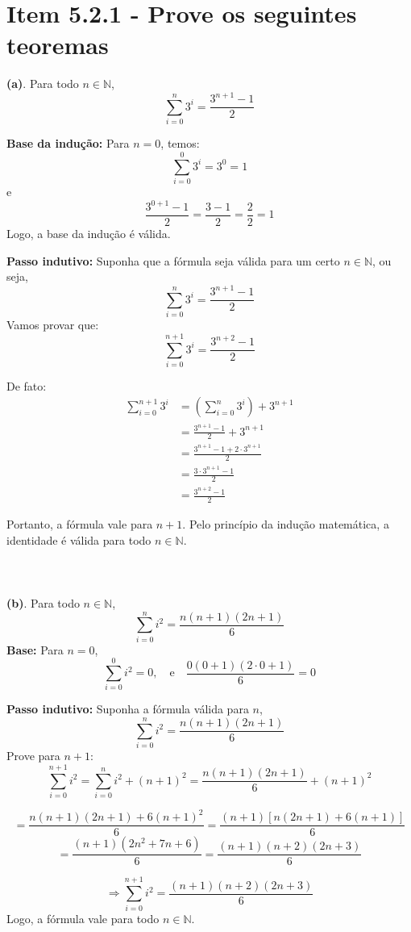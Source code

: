 \documentclass{article}
\begin{document}
\section{Item 5.2.1 - Prove os seguintes teoremas}

\textbf{(a)}. 
Para todo \( n \in \mathbb{N} \),\[\sum_{i=0}^{n} 3^i=\frac{3^{n+1} - 1}{2}\]

\textbf{Base da indução:} Para \( n = 0 \), temos:
\[
\sum_{i=0}^{0} 3^i = 3^0 = 1
\]
e
\[
\frac{3^{0+1} - 1}{2} = \frac{3 - 1}{2} = \frac{2}{2} = 1
\]
Logo, a base da indução é válida.

\textbf{Passo indutivo:} Suponha que a fórmula seja válida para um certo \( n \in \mathbb{N} \), ou seja,
\[
\sum_{i=0}^{n} 3^i = \frac{3^{n+1} - 1}{2}
\]
Vamos provar que:
\[
\sum_{i=0}^{n+1} 3^i = \frac{3^{n+2} - 1}{2}
\]

De fato:
\begin{align*}
\sum_{i=0}^{n+1} 3^i &= \left( \sum_{i=0}^{n} 3^i \right) + 3^{n+1} \\
&= \frac{3^{n+1} - 1}{2} + 3^{n+1} \\
&= \frac{3^{n+1} - 1 + 2 \cdot 3^{n+1}}{2} \\
&= \frac{3 \cdot 3^{n+1} - 1}{2} \\
&= \frac{3^{n+2} - 1}{2}
\end{align*}

Portanto, a fórmula vale para \( n+1 \). Pelo princípio da indução matemática, a identidade é válida para todo \( n \in \mathbb{N} \).
\\\\
\\\\
\textbf{(b)}. Para todo \( n \in \mathbb{N} \),
\[
\sum_{i=0}^{n} i^2 = \frac{n(n+1)(2n+1)}{6}
\]
\textbf{Base:} Para \( n = 0 \),
\[
\sum_{i=0}^0 i^2 = 0, \quad \text{e} \quad \frac{0(0+1)(2 \cdot 0 + 1)}{6} = 0
\]

\textbf{Passo indutivo:} Suponha a fórmula válida para \( n \),
\[
\sum_{i=0}^n i^2 = \frac{n(n+1)(2n+1)}{6}
\]
Prove para \( n+1 \):
\[
\sum_{i=0}^{n+1} i^2 = \sum_{i=0}^n i^2 + (n+1)^2 = \frac{n(n+1)(2n+1)}{6} + (n+1)^2
\]

\[
= \frac{n(n+1)(2n+1) + 6(n+1)^2}{6} = \frac{(n+1)\left[n(2n+1)+6(n+1)\right]}{6}
\]
\[
= \frac{(n+1)(2n^2 + 7n + 6)}{6} = \frac{(n+1)(n+2)(2n+3)}{6}
\]

\[
\Rightarrow \sum_{i=0}^{n+1} i^2 = \frac{(n+1)(n+2)(2n+3)}{6}
\]
Logo, a fórmula vale para todo \( n \in \mathbb{N} \).
\end{document}
